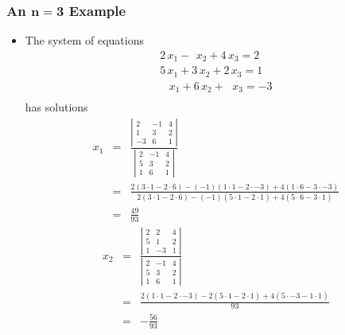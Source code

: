 \documentclass[12pt]{article}
\begin{document}
\subsubsection*{An $\mathbf{n=3}$ Example}
\begin{itemize}
\item The system of equations
\begin{equation}
\begin{array}{c}
2 \, x_1 - ~ \, x_2 + 4 \, x_3 = 2 \\
5 \, x_1 + 3 \, x_2 + 2 \, x_3 = 1 \\
~~~ \, x_1 + 6 \, x_2 + ~~ \, x_3 = -3 \\
\end{array}
\label{eq:3eq}
\end{equation}
has solutions
\begin{eqnarray}
\nonumber
x_1 & = &
\frac{
\left|
\begin{array}{ccc}
 2 & -1 & 4 \\
 1 &  3 & 2 \\
-3 &  6 & 1
\end{array}
\right|
}{
\left|
\begin{array}{ccc}
 2 & -1 & 4 \\
 5 &  3 & 2 \\
 1 &  6 & 1
\end{array}
\right|
} \\
\nonumber
& = & 
\frac{
    2 (3 \cdot 1 - 2 \cdot 6)
- (-1)(1 \cdot 1 - 2 \cdot -3)
+   4 (1 \cdot 6 - 3 \cdot -3)
}{
    2 (3 \cdot 1 - 2 \cdot 6)
- (-1)(5 \cdot 1 - 2 \cdot 1)
+   4 (5 \cdot 6 - 3 \cdot 1)
}\\
&=&\frac{49}{93}
\end{eqnarray}
\begin{eqnarray}
\nonumber
x_2 &=& 
\frac{
\left|
\begin{array}{ccc}
 2 &  2 & 4 \\
 5 &  1 & 2 \\
 1 & -3 & 1
\end{array}
\right|
}{
\left|
\begin{array}{ccc}
 2 & -1 & 4 \\
 5 &  3 & 2 \\
 1 &  6 & 1
\end{array}
\right|
}\\
\nonumber
&=&  
\frac{
  2 (1 \cdot 1 - 2 \cdot -3)
- 2 (5 \cdot 1 - 2 \cdot  1)
+ 4 (5 \cdot -3 - 1 \cdot 1)
}{93}\\
&=& -\frac{56}{93}
\end{eqnarray}

\end{itemize}
\end{document}
